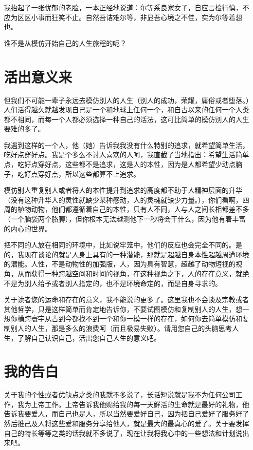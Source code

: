\documentclass[12pt]{exam}%
\begin{document}
我抬起了一张忧郁的老脸，一本正经地说道：尔等系良家女子，自应言检行慎，不应为区区小事而狂笑不止。自然吾诘难尔等，非显吾心境之不佳，实为尔等着想也。

谁不是从模仿开始自己的人生旅程的呢？


\section{活出意义来}
但我们不可能一辈子永远去模仿别人的人生（别人的成功，荣耀，庸俗或者堕落。）人们活得越久就越发现自己是一个和地球上任何一个，和自古以来的任何一个人类都不相同，而每一个人都必须选择一种自己的活法，这可比简单的模仿别人的人生要难的多了。

我遇到这样的一个人，他（她）告诉我我没有什么特别的追求，就希望简单生活，吃好点穿好点。我是个多么不讨人喜欢的人呵，我直截了当地指出：希望生活简单点，吃好点穿好点，这些都不是追求，这是人的本性，因为是人都希望少动点脑子，吃好点穿好点，所以这些都算不上追求。

模仿别人重复别人或者将人的本性提升到追求的高度都不助于人精神层面的升华（没有这种升华人的灵性就缺少某种感动，人的灵魂就缺少力量。），你们看啊，四周的植物动物，他们都遵循着自己的本性，只有人不同，人与人之间长相都差不多（一个脑袋两个胳膊），但你根本无法越测他下一秒将会干什么，因为他有着丰富的内心的世界。

把不同的人放在相同的环境中，比如说牢笼中，他们的反应也会完全不同的。是的，我现在谈论的就是人身上具有的一种潜能，那就是超越自身本性超越周遭环境的潜能。人性，不是动物性的加强版，人，因为具有智慧，超越了动物短视的视角，从而获得一种跨越空间和时间的视角，在这种视角之下，人的存在意义，就绝不是为别人给予或者别人指定的，也不是环境命定的，而是自身寻求的。

关于读者您的运命和存在的意义，我不能说的更多了。这里我也不会谈及宗教或者其他哲学，只是这样简单而肯定地告诉你，不要试图模仿和复制别人的人生，想一想你横跨寰宇从古到今都找不到一个和你一模一样的存在，如何你去简单模仿和复制别人的人生，那是多么的浪费呵（而且极易失败）。请用您自己的头脑思考人生，了解自己认识自己，活出您自己人生的意义吧。


\section{我的告白}
关于我的个性或者优缺点之类的我就不多说了，长话短说就是我不为任何公司工作，我为上帝工作。上帝告诉我他赐给我的每一天鲜活的生命就是最好的礼物，他告诉我要爱人，而自己也是人，所以当然要爱好自己，因为把自己爱好了服务好了然后推己及人将这些爱和服务分享给他人，就是最大的最真心的爱了。关于要发挥自己的特长等等之类的话我就不多说了，现在让我将我心中的一些想法和计划说出来吧。
\end{document}
